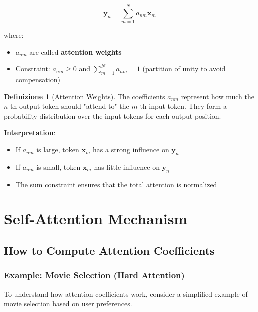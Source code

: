 \documentclass[11pt,a4paper]{article}
\theoremstyle{definition}
\newtheorem{definition}{Definizione}[section]
\theoremstyle{plain}
\theoremstyle{remark}
\begin{document}
\[
\mathbf{y}_n = \sum_{m=1}^{N} a_{nm} \mathbf{x}_m
\]

where:
\begin{itemize}
    \item $a_{nm}$ are called \textbf{attention weights}
    \item Constraint: $a_{nm} \geq 0$ and $\sum_{m=1}^{N} a_{nm} = 1$ (partition of unity to avoid compensation)
\end{itemize}

\begin{definition}[Attention Weights]
The coefficients $a_{nm}$ represent how much the $n$-th output token should "attend to" the $m$-th input token. They form a probability distribution over the input tokens for each output position.
\end{definition}

\textbf{Interpretation}:
\begin{itemize}
    \item If $a_{nm}$ is large, token $\mathbf{x}_m$ has a strong influence on $\mathbf{y}_n$
    \item If $a_{nm}$ is small, token $\mathbf{x}_m$ has little influence on $\mathbf{y}_n$
    \item The sum constraint ensures that the total attention is normalized
\end{itemize}

\section{Self-Attention Mechanism}

\subsection{How to Compute Attention Coefficients}

\subsubsection{Example: Movie Selection (Hard Attention)}

To understand how attention coefficients work, consider a simplified example of movie selection based on user preferences.
\end{document}
